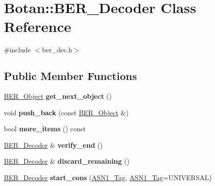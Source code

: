 \hypertarget{classBotan_1_1BER__Decoder}{\section{Botan\-:\-:B\-E\-R\-\_\-\-Decoder Class Reference}
\label{classBotan_1_1BER__Decoder}
}


{\ttfamily \#include $<$ber\-\_\-dec.\-h$>$}

\subsection*{Public Member Functions}
\begin{DoxyCompactItemize}
\item 
\hypertarget{classBotan_1_1BER__Decoder_a2422c588a5e0e1c1555f178c0cc075ef}{\hyperlink{classBotan_1_1BER__Object}{B\-E\-R\-\_\-\-Object} {\bfseries get\-\_\-next\-\_\-object} ()}\label{classBotan_1_1BER__Decoder_a2422c588a5e0e1c1555f178c0cc075ef}

\item 
\hypertarget{classBotan_1_1BER__Decoder_abdd4d6a7068a7d746f038b5075f571d9}{void {\bfseries push\-\_\-back} (const \hyperlink{classBotan_1_1BER__Object}{B\-E\-R\-\_\-\-Object} \&)}\label{classBotan_1_1BER__Decoder_abdd4d6a7068a7d746f038b5075f571d9}

\item 
\hypertarget{classBotan_1_1BER__Decoder_ae554df9066d8f93f53d583cfbb955f4f}{bool {\bfseries more\-\_\-items} () const }\label{classBotan_1_1BER__Decoder_ae554df9066d8f93f53d583cfbb955f4f}

\item 
\hypertarget{classBotan_1_1BER__Decoder_a74a5fea126b857ca9cabfcbe41e3a88f}{\hyperlink{classBotan_1_1BER__Decoder}{B\-E\-R\-\_\-\-Decoder} \& {\bfseries verify\-\_\-end} ()}\label{classBotan_1_1BER__Decoder_a74a5fea126b857ca9cabfcbe41e3a88f}

\item 
\hypertarget{classBotan_1_1BER__Decoder_aa27fc56fa6532c5d0db5deb37d594a07}{\hyperlink{classBotan_1_1BER__Decoder}{B\-E\-R\-\_\-\-Decoder} \& {\bfseries discard\-\_\-remaining} ()}\label{classBotan_1_1BER__Decoder_aa27fc56fa6532c5d0db5deb37d594a07}

\item 
\hypertarget{classBotan_1_1BER__Decoder_a35cd02146d2f89abf7f2a64fa4787db1}{\hyperlink{classBotan_1_1BER__Decoder}{B\-E\-R\-\_\-\-Decoder} {\bfseries start\-\_\-cons} (\hyperlink{namespaceBotan_aaa08f67a945ef195fa39e62659dffa7a}{A\-S\-N1\-\_\-\-Tag}, \hyperlink{namespaceBotan_aaa08f67a945ef195fa39e62659dffa7a}{A\-S\-N1\-\_\-\-Tag}=U\-N\-I\-V\-E\-R\-S\-A\-L)}\label{classBotan_1_1BER__Decoder_a35cd02146d2f89abf7f2a64fa4787db1}


\end{DoxyCompactItemize}
